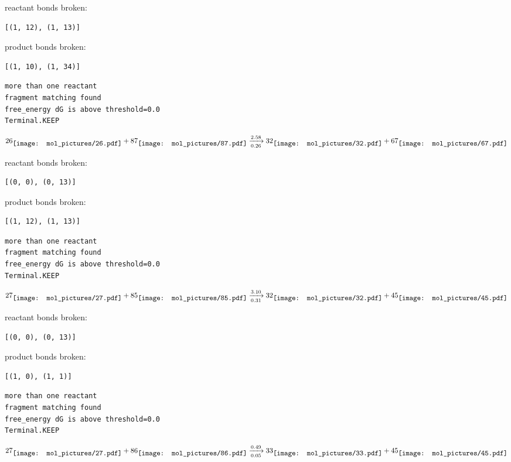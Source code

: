 \documentclass{article}
\begin{document}
reactant bonds broken:\begin{verbatim}
[(1, 12), (1, 13)]
\end{verbatim}
product bonds broken:\begin{verbatim}
[(1, 10), (1, 34)]
\end{verbatim}




\vspace{1cm}
\begin{verbatim}
more than one reactant
fragment matching found
free_energy dG is above threshold=0.0
Terminal.KEEP
\end{verbatim}
$$
26
\raisebox{-.5\height}{\texttt{[image: mol\_pictures/26.pdf]}}
+
87
\raisebox{-.5\height}{\texttt{[image: mol\_pictures/87.pdf]}}
\xrightarrow[0.26]{2.58}
32
\raisebox{-.5\height}{\texttt{[image: mol\_pictures/32.pdf]}}
+
67
\raisebox{-.5\height}{\texttt{[image: mol\_pictures/67.pdf]}}
$$


reactant bonds broken:\begin{verbatim}
[(0, 0), (0, 13)]
\end{verbatim}
product bonds broken:\begin{verbatim}
[(1, 12), (1, 13)]
\end{verbatim}




\vspace{1cm}
\begin{verbatim}
more than one reactant
fragment matching found
free_energy dG is above threshold=0.0
Terminal.KEEP
\end{verbatim}
$$
27
\raisebox{-.5\height}{\texttt{[image: mol\_pictures/27.pdf]}}
+
85
\raisebox{-.5\height}{\texttt{[image: mol\_pictures/85.pdf]}}
\xrightarrow[0.31]{3.10}
32
\raisebox{-.5\height}{\texttt{[image: mol\_pictures/32.pdf]}}
+
45
\raisebox{-.5\height}{\texttt{[image: mol\_pictures/45.pdf]}}
$$


reactant bonds broken:\begin{verbatim}
[(0, 0), (0, 13)]
\end{verbatim}
product bonds broken:\begin{verbatim}
[(1, 0), (1, 1)]
\end{verbatim}




\vspace{1cm}
\begin{verbatim}
more than one reactant
fragment matching found
free_energy dG is above threshold=0.0
Terminal.KEEP
\end{verbatim}
$$
27
\raisebox{-.5\height}{\texttt{[image: mol\_pictures/27.pdf]}}
+
86
\raisebox{-.5\height}{\texttt{[image: mol\_pictures/86.pdf]}}
\xrightarrow[0.05]{0.49}
33
\raisebox{-.5\height}{\texttt{[image: mol\_pictures/33.pdf]}}
+
45
\raisebox{-.5\height}{\texttt{[image: mol\_pictures/45.pdf]}}
$$
\end{document}
